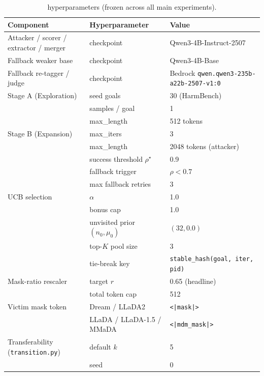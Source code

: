 \begin{table}[h]
\centering
\small
\caption{\method hyperparameters (frozen across all main experiments).}
\label{tab:hparams}
\begin{tabular}{l l l}
\toprule
Component & Hyperparameter & Value \\
\midrule
Attacker / scorer / extractor / merger & checkpoint & Qwen3-4B-Instruct-2507 \\
Fallback weaker base               & checkpoint  & Qwen3-4B-Base \\
Fallback re-tagger / judge         & checkpoint  & Bedrock \texttt{qwen.qwen3-235b-a22b-2507-v1:0} \\
Stage A (Exploration)              & seed goals  & 30 (HarmBench) \\
                                   & samples / goal & 1 \\
                                   & max\_length & 512 tokens \\
Stage B (Expansion)                & max\_iters  & 3 \\
                                   & max\_length & 2048 tokens (attacker) \\
                                   & success threshold $\rho^\star$ & 0.9 \\
                                   & fallback trigger              & $\rho < 0.7$ \\
                                   & max fallback retries          & 3 \\
UCB selection                      & $\alpha$    & 1.0 \\
                                   & bonus cap   & 1.0 \\
                                   & unvisited prior $(n_0, \mu_0)$ & $(32, 0.0)$ \\
                                   & top-$K$ pool size              & 3 \\
                                   & tie-break key                  & \texttt{stable\_hash(goal, iter, pid)} \\
Mask-ratio rescaler                & target $r$  & 0.65 (headline) \\
                                   & total token cap                & 512 \\
Victim mask token                  & Dream / LLaDA2                 & \texttt{<|mask|>} \\
                                   & LLaDA / LLaDA-1.5 / MMaDA      & \texttt{<|mdm\_mask|>} \\
Transferability (\texttt{transition.py}) & default $k$              & 5 \\
                                   & seed                           & 0 \\
\bottomrule
\end{tabular}
\end{table}

